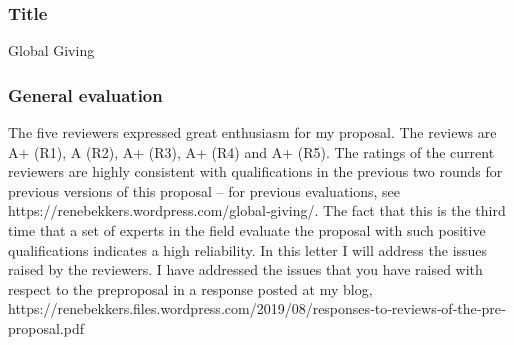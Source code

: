 \documentclass[twocolumn, serif, rga, numeric]{jote-article}
\begin{document}
\subsubsection{Title}
Global Giving
\subsubsection{General evaluation}
The five reviewers expressed great enthusiasm for my proposal. The reviews are A+ (R1), A (R2), A+ (R3), A+ (R4) and A+ (R5).
The ratings of the current reviewers are highly consistent with qualifications in the previous two rounds for previous versions of this proposal – for previous evaluations, see https://renebekkers.wordpress.com/global‐giving/. The fact that this is the third time that a set of experts in the field evaluate the proposal with such positive qualifications indicates a high reliability.
In this letter I will address the issues raised by the reviewers. I have addressed the issues that you have raised with respect to the preproposal in a response posted at my blog, https://renebekkers.files.wordpress.com/2019/08/responses‐to‐reviews‐of‐the‐pre‐proposal.pdf
\end{document}
